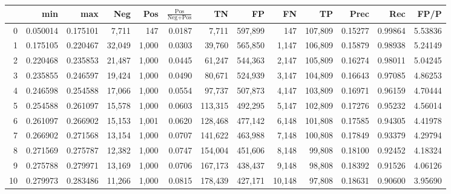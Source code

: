 \begin{tabular}{rrrrrrrrrrrrr}
\toprule
{} &       min &       max &     Neg &    Pos & $\frac{\text{Pos}}{\text{Neg}+\text{Pos}}$ &       TN &       FP &       FN &       TP &     Prec &      Rec &     FP/P \\
\midrule
0   &  0.050014 &  0.175101 &   7,711 &    147 &                                     0.0187 &    7,711 &  597,899 &      147 &  107,809 &  0.15277 &  0.99864 &  5.53836 \\
1   &  0.175105 &  0.220467 &  32,049 &  1,000 &                                     0.0303 &   39,760 &  565,850 &    1,147 &  106,809 &  0.15879 &  0.98938 &  5.24149 \\
2   &  0.220468 &  0.235853 &  21,487 &  1,000 &                                     0.0445 &   61,247 &  544,363 &    2,147 &  105,809 &  0.16274 &  0.98011 &  5.04245 \\
3   &  0.235855 &  0.246597 &  19,424 &  1,000 &                                     0.0490 &   80,671 &  524,939 &    3,147 &  104,809 &  0.16643 &  0.97085 &  4.86253 \\
4   &  0.246598 &  0.254588 &  17,066 &  1,000 &                                     0.0554 &   97,737 &  507,873 &    4,147 &  103,809 &  0.16971 &  0.96159 &  4.70444 \\
5   &  0.254588 &  0.261097 &  15,578 &  1,000 &                                     0.0603 &  113,315 &  492,295 &    5,147 &  102,809 &  0.17276 &  0.95232 &  4.56014 \\
6   &  0.261097 &  0.266902 &  15,153 &  1,001 &                                     0.0620 &  128,468 &  477,142 &    6,148 &  101,808 &  0.17585 &  0.94305 &  4.41978 \\
7   &  0.266902 &  0.271568 &  13,154 &  1,000 &                                     0.0707 &  141,622 &  463,988 &    7,148 &  100,808 &  0.17849 &  0.93379 &  4.29794 \\
8   &  0.271569 &  0.275787 &  12,382 &  1,000 &                                     0.0747 &  154,004 &  451,606 &    8,148 &   99,808 &  0.18100 &  0.92452 &  4.18324 \\
9   &  0.275788 &  0.279971 &  13,169 &  1,000 &                                     0.0706 &  167,173 &  438,437 &    9,148 &   98,808 &  0.18392 &  0.91526 &  4.06126 \\
10  &  0.279973 &  0.283486 &  11,266 &  1,000 &                                     0.0815 &  178,439 &  427,171 &   10,148 &   97,808 &  0.18631 &  0.90600 &  3.95690 \\

\end{tabular}
